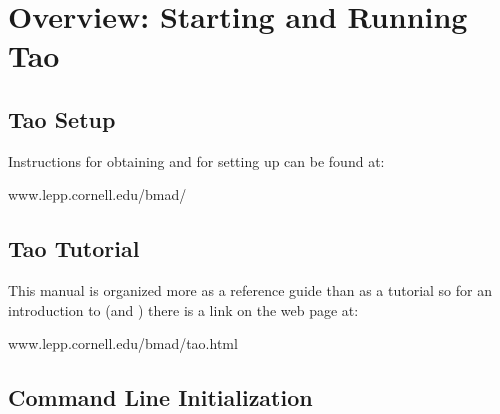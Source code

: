 \chapter{Overview: Starting and Running Tao}
\label{c:overview.tao}

\section{Tao Setup}
\label{s:obtaining}

Instructions for obtaining and for setting up \tao can be found at:
\begin{example}
  www.lepp.cornell.edu/bmad/
\end{example}

\section{Tao Tutorial}
\label{s:tutorial}

This manual is organized more as a reference guide than as a tutorial so for an introduction
to \tao (and \bmad) there is a link on the web page at:
\begin{example}
  www.lepp.cornell.edu/bmad/tao.html
\end{example}

\section{Command Line Initialization}
\label{s:command.line} 

